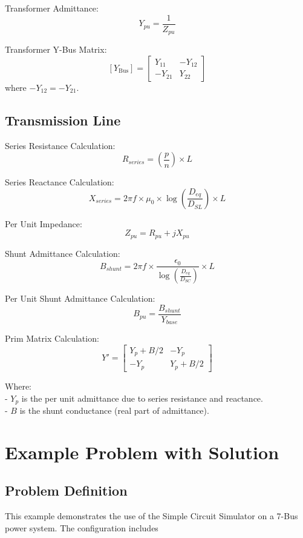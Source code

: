 \documentclass{article}
\begin{document}
	\noindent
	Transformer Admittance:
	\[ Y_{pu} = \frac{1}{Z_{pu}} \]
	
	\noindent
	Transformer Y-Bus Matrix:
	\[ [Y_{\text{Bus}}] = 
	\begin{bmatrix}
		Y_{11} & -Y_{12} \\
		-Y_{21} & Y_{22}
	\end{bmatrix} \]
	where \( -Y_{12} = -Y_{21} \).
	
	\subsection*{Transmission Line}
	Series Resistance Calculation: 
	\[
	R_{series} = (\frac{p}{n}) \times L
	\]
	
	\noindent	
	Series Reactance Calculation: 
	\[
	X_{series} = 2 \pi f \times \mu_0 \times \log(\frac{D_{eq}}{D_{SL}}) \times L
	\]
	
	\noindent
	Per Unit Impedance: 
	\[
	Z_{pu} = R_{pu} + j X_{pu}
	\]
	
	\noindent
	Shunt Admittance Calculation: 
	\[
	B_{shunt} = 2 \pi f \times \frac{\epsilon_0}{\log(\frac{D_{eq}}{D_{SC}})} \times L
	\]

	\noindent
	Per Unit Shunt Admittance Calculation: 
	\[
	B_{pu} = \frac{B_{shunt}}{Y_{base}}
	\]

	\noindent	
	Prim Matrix Calculation:
	\[
	Y' = \begin{bmatrix}
		Y_p + B/2 & -Y_p \\
		-Y_p & Y_p + B/2
	\end{bmatrix}
	\]
	
	\noindent
	Where: \\
	- \(Y_p\) is the per unit admittance due to series resistance and reactance. \\
	- \(B\) is the shunt conductance (real part of admittance).
	
	\section{Example Problem with Solution}
	
	\subsection{Problem Definition}
	
	\noindent
	This example demonstrates the use of the Simple Circuit Simulator on a 7-Bus power system. The configuration includes
	
\end{document}
